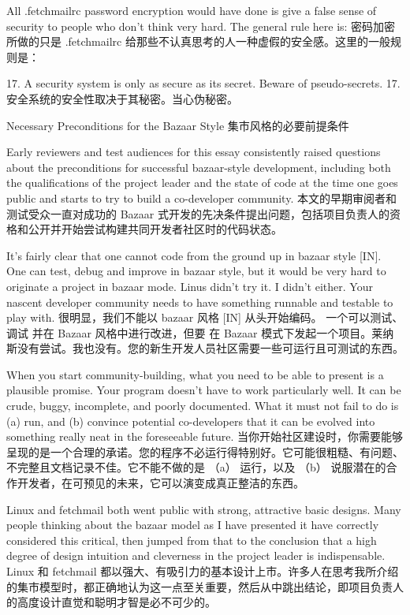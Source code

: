 \documentclass[a4paper,12pt,UTF8,twoside]{ctexbook}
\begin{document}
All .fetchmailrc password encryption would have done is give a false sense of security to people who don't think very hard. The general rule here is:
密码加密所做的只是 .fetchmailrc 给那些不认真思考的人一种虚假的安全感。这里的一般规则是：

17. A security system is only as secure as its secret. Beware of pseudo-secrets.
17. 安全系统的安全性取决于其秘密。当心伪秘密。

 Necessary Preconditions for the Bazaar Style
集市风格的必要前提条件

Early reviewers and test audiences for this essay consistently raised questions about the preconditions for successful bazaar-style development, including both the qualifications of the project leader and the state of code at the time one goes public and starts to try to build a co-developer community.
本文的早期审阅者和测试受众一直对成功的 Bazaar 式开发的先决条件提出问题，包括项目负责人的资格和公开并开始尝试构建共同开发者社区时的代码状态。

It's fairly clear that one cannot code from the ground up in bazaar style [IN]. One can test, debug and improve in bazaar style, but it would be very hard to originate a project in bazaar mode. Linus didn't try it. I didn't either. Your nascent developer community needs to have something runnable and testable to play with.
很明显，我们不能以 bazaar 风格 [IN] 从头开始编码。 一个可以测试、调试 并在 Bazaar 风格中进行改进，但要 在 Bazaar 模式下发起一个项目。莱纳斯没有尝试。我也没有。您的新生开发人员社区需要一些可运行且可测试的东西。

When you start community-building, what you need to be able to present is a plausible promise. Your program doesn't have to work particularly well. It can be crude, buggy, incomplete, and poorly documented. What it must not fail to do is (a) run, and (b) convince potential co-developers that it can be evolved into something really neat in the foreseeable future.
当你开始社区建设时，你需要能够呈现的是一个合理的承诺。您的程序不必运行得特别好。它可能很粗糙、有问题、不完整且文档记录不佳。它不能不做的是 （a） 运行，以及 （b） 说服潜在的合作开发者，在可预见的未来，它可以演变成真正整洁的东西。

Linux and fetchmail both went public with strong, attractive basic designs. Many people thinking about the bazaar model as I have presented it have correctly considered this critical, then jumped from that to the conclusion that a high degree of design intuition and cleverness in the project leader is indispensable.
Linux 和 fetchmail 都以强大、有吸引力的基本设计上市。许多人在思考我所介绍的集市模型时，都正确地认为这一点至关重要，然后从中跳出结论，即项目负责人的高度设计直觉和聪明才智是必不可少的。
\end{document}
